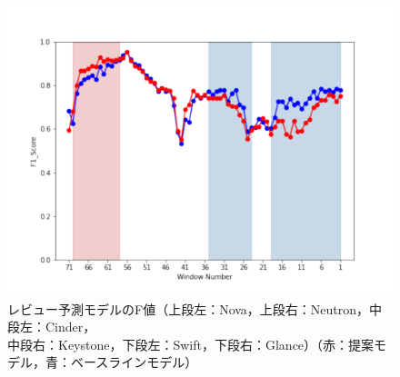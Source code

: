 \documentclass[submit]{ipsj}
\begin{document}
\begin{figure}[t]
\begin{minipage}[b]{0.65\columnwidth}
    \includegraphics[width=1\columnwidth]{Uenaka_fig/RQ2_result/Glance/Glance_review_F1.pdf}
\end{minipage}
    \caption{レビュー予測モデルのF値（上段左：Nova，上段右：Neutron，中段左：Cinder，\\ 中段右：Keystone，下段左：Swift，下段右：Glance）（赤：提案モデル，青：ベースラインモデル）}
    \label{fig:review_p}
\end{figure}

\end{document}
